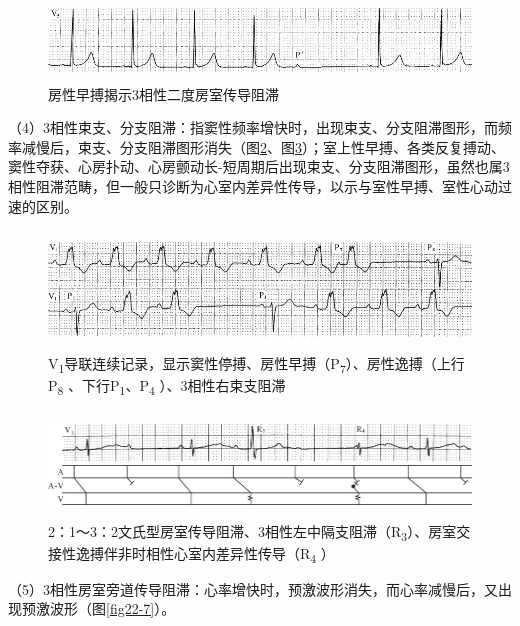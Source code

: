 \begin{figure}[!htbp]
 \centering
 \includegraphics[width=5.58333in,height=0.83333in]{./images/Image00369.jpg}
 \captionsetup{justification=centering}
 \caption{房性早搏揭示3相性二度房室传导阻滞}
 \label{fig22-4}
  \end{figure} 

（4）3相性束支、分支阻滞：指窦性频率增快时，出现束支、分支阻滞图形，而频率减慢后，束支、分支阻滞图形消失（图\ref{fig22-5}、图\ref{fig22-6}）；室上性早搏、各类反复搏动、窦性夺获、心房扑动、心房颤动长-短周期后出现束支、分支阻滞图形，虽然也属3相性阻滞范畴，但一般只诊断为心室内差异性传导，以示与室性早搏、室性心动过速的区别。

\begin{figure}[!htbp]
 \centering
 \includegraphics[width=5.58333in,height=1.23958in]{./images/Image00370.jpg}
 \captionsetup{justification=centering}
 \caption{V\textsubscript{1}导联连续记录，显示窦性停搏、房性早搏（P\textsubscript{7}）、房性逸搏（上行P\textsubscript{8} 、下行P\textsubscript{1}、P\textsubscript{4} ）、3相性右束支阻滞}
 \label{fig22-5}
  \end{figure} 


\begin{figure}[!htbp]
 \centering
 \includegraphics[width=5.79167in,height=1.09375in]{./images/Image00371.jpg}
 \captionsetup{justification=centering}
 \caption{2：1～3：2文氏型房室传导阻滞、3相性左中隔支阻滞（R\textsubscript{3}）、房室交接性逸搏伴非时相性心室内差异性传导（R\textsubscript{4} ）}
 \label{fig22-6}
  \end{figure} 


（5）3相性房室旁道传导阻滞：心率增快时，预激波形消失，而心率减慢后，又出现预激波形（图\ref{fig22-7}）。

